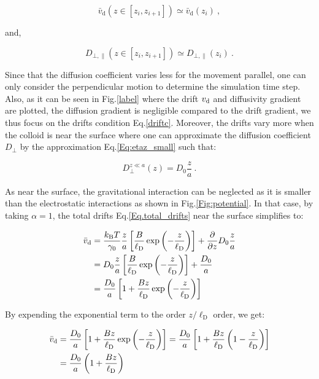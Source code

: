 \begin{equation}
	\bar{v}_\mathrm{d} (z \in [z_i, z_{i+1}]) \simeq \bar{v}_\mathrm{d} (z_i) ~,
	\label{driftc}
\end{equation}

and,

\begin{equation}
	D_{\bot, \parallel}(z \in [z_i, z_{i+1}]) \simeq D_{\bot, \parallel}(z_i) ~.
\end{equation}

Since that the diffusion coefficient varies less for the movement parallel, one can only consider the perpendicular motion to determine the simulation time step. Also, as it can be seen in Fig.\ref{label} where the drift $v_\textnormal{d}$ and diffusivity gradient are plotted, the diffusion gradient is negligible compared to the drift gradient, we thus focus on the drifts condition Eq.\ref{driftc}. Moreover, the drifts vary more when the colloid is near the surface where one can approximate the diffusion coefficient $D_\bot$ by the approximation Eq.\ref{Eq:etaz_small} such that:

\begin{equation}
	D_\bot ^{z\ll a} (z) = D_ 0 \frac{z}{a} ~.
\end{equation}

As near the surface, the gravitational interaction can be neglected as it is smaller than the electrostatic interactions as shown in Fig.\ref{Fig:potential}. In that case, by taking $\alpha = 1$, the total drifts Eq.\ref{Eq.total_drifts} near the surface simplifies to:

\begin{equation}
	\begin{aligned}
		\bar{v}_\textnormal{d} &=  \frac{k_\mathrm{B}T}{\gamma_0} \frac{z}{a} \left[\frac{B}{\ell_\mathrm{D}} \exp \left(-\frac{z}{\ell_\mathrm{D}}\right)\right] + \frac{\partial}{\partial z} D_0 \frac{z}{a} \\
		&= D_0 \frac{z}{a} \left[\frac{B}{\ell_\mathrm{D}} \exp \left(-\frac{z}{\ell_\mathrm{D}}\right)\right] + \frac{D_0}{a} \\
		&= \frac{D_0}{a} \left[ 1 + \frac{Bz}{\ell_\mathrm{D}} \exp \left(-\frac{z}{\ell_\mathrm{D}}\right)\right]
	\end{aligned}
\end{equation}

By expending the exponential term to the order $z/\ell_\mathrm{D}$ order, we get:

\begin{equation}
	\begin{aligned}
		\bar{v}_\textnormal{d} &= \frac{D_0}{a} \left[ 1 + \frac{Bz}{\ell_\mathrm{D}} \exp \left(-\frac{z}{\ell_\mathrm{D}}\right)\right]
		=  \frac{D_0}{a} \left[ 1 + \frac{Bz}{\ell_\mathrm{D}}  \left(1 -\frac{z}{\ell_\mathrm{D}}\right)\right] \\
		& = \frac{D_0}{a} \left( 1 + \frac{B z}{\ell_\mathrm{D}}\right)
	\end{aligned}
	\label{drifts_short}
\end{equation}

